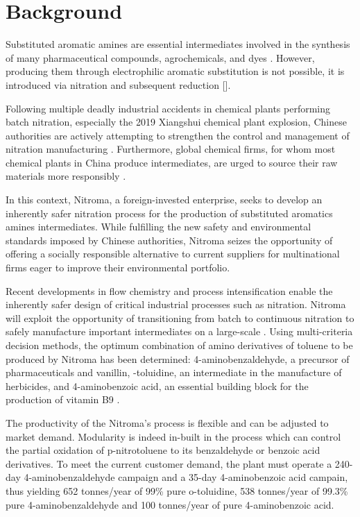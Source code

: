 \section*{Background}

Substituted aromatic amines are essential intermediates involved in the synthesis of many pharmaceutical compounds, agrochemicals, and dyes \cite{vogt_amines_2000}. However, producing them through electrophilic aromatic substitution is not possible, it is introduced via nitration and subsequent reduction []. 

Following multiple deadly industrial accidents in chemical plants performing batch nitration, especially the 2019 Xiangshui chemical plant explosion, Chinese authorities are actively attempting to strengthen the control and management of nitration manufacturing \cite{el_diario_china_2019}. Furthermore, global chemical firms, for whom most chemical plants in China produce intermediates, are urged to source their raw materials more responsibly \cite{stanway_global_2019}.



In this context, Nitroma, a foreign-invested enterprise, seeks to develop an inherently safer nitration process for the production of substituted aromatics amines intermediates. While fulfilling the new safety and environmental standards imposed by Chinese authorities, Nitroma seizes the opportunity of offering a socially responsible alternative to current suppliers for multinational firms eager to improve their environmental portfolio. 

Recent developments in flow chemistry and process intensification enable the inherently safer design of critical industrial processes such as nitration. Nitroma will exploit the opportunity of transitioning from batch to continuous nitration to safely manufacture important intermediates on a large-scale \cite{di_miceli_raimondi_safety_2015}. Using multi-criteria decision methods, the optimum combination of amino derivatives of toluene to be produced by Nitroma has been determined: 4-aminobenzaldehyde, a precursor of pharmaceuticals and vanillin, \ortho-toluidine, an intermediate in the manufacture of herbicides, and 4-aminobenzoic acid, an essential building block for the production of vitamin B9 \cite{bowers_toluidines_2000,bruhne_benzaldehyde_2011,maki_benzoic_2000}.

The productivity of the Nitroma's process is flexible and can be adjusted to market demand. Modularity is indeed in-built in the process which can control the partial oxidation of p-nitrotoluene to its benzaldehyde or benzoic acid derivatives. To meet the current customer demand, the plant must operate a 240-day 4-aminobenzaldehyde campaign and a 35-day 4-aminobenzoic acid campain, thus yielding 652 tonnes/year of 99\% pure o-toluidine, 538 tonnes/year of 99.3\% pure 4-aminobenzaldehyde and 100 tonnes/year of pure 4-aminobenzoic acid.

